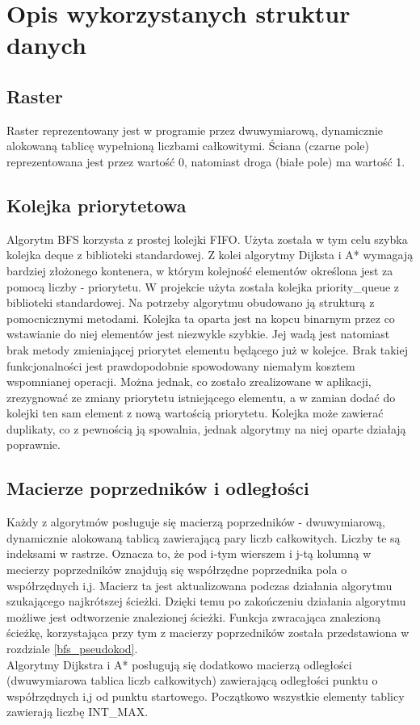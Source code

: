 \documentclass[11pt,a4paper]{article}
\begin{document}
\section{Opis wykorzystanych struktur danych}
\subsection{Raster}
Raster reprezentowany jest w programie przez dwuwymiarową, dynamicznie alokowaną tablicę
wypełnioną liczbami całkowitymi. Ściana (czarne pole) reprezentowana jest przez wartość 0, 
natomiast droga (białe pole) ma wartość 1.

\subsection{Kolejka priorytetowa}\label{priorityQueue}
Algorytm BFS korzysta z prostej kolejki FIFO. Użyta została w tym celu szybka kolejka 
deque z biblioteki standardowej. Z kolei algorytmy Dijksta i A* wymagają bardziej złożonego
kontenera, w którym kolejność elementów określona jest za pomocą liczby - priorytetu.
W projekcie użyta została kolejka priority\_queue z
biblioteki standardowej. Na potrzeby algorytmu obudowano ją strukturą z pomocnicznymi
metodami. Kolejka ta oparta jest na kopcu binarnym przez co wstawianie do niej elementów
jest niezwykle szybkie. Jej wadą jest natomiast brak metody zmieniającej priorytet
elementu będącego już w kolejce. Brak takiej funkcjonalności jest prawdopodobnie
spowodowany niemałym kosztem wspomnianej operacji. Można jednak, co zostało zrealizowane w
aplikacji, zrezygnować ze zmiany priorytetu istniejącego elementu, a w zamian dodać
do kolejki ten sam element z nową wartością priorytetu. Kolejka może zawierać duplikaty,
co z pewnością ją spowalnia, jednak algorytmy na niej oparte działają poprawnie.

\subsection{Macierze poprzedników i odległości}
Każdy z algorytmów posługuje się macierzą poprzedników - dwuwymiarową, dynamicznie
alokowaną tablicą zawierającą
pary liczb całkowitych. Liczby te są indeksami w rastrze. Oznacza to, że pod i-tym wierszem
i j-tą kolumną w mecierzy poprzedników znajdują się współrzędne poprzednika pola o
współrzędnych i,j. Macierz ta jest aktualizowana podczas działania algorytmu szukającego
najkrótszej ścieżki. Dzięki temu po zakończeniu działania algorytmu możliwe jest
odtworzenie znalezionej ścieżki. Funkcja zwracająca znalezioną ścieżkę, korzystająca
przy tym z macierzy poprzedników została przedstawiona w rozdziale \ref{bfs_pseudokod}.\\
Algorytmy Dijkstra i A* posługują się dodatkowo macierzą odległości (dwuwymiarowa tablica
liczb całkowitych) zawierającą odległości punktu o współrzędnych i,j od punktu startowego. Początkowo
wszystkie elementy tablicy zawierają liczbę INT\_MAX.
\end{document}

